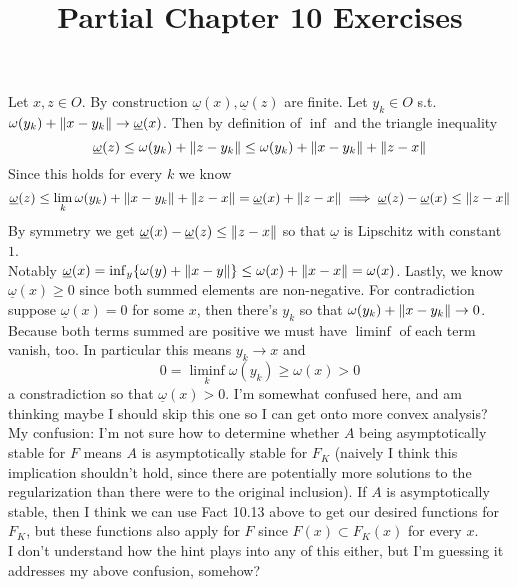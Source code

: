 \documentclass{article}
\title{Partial Chapter 10 Exercises}
\newenvironment{ex}[1]
  {\renewcommand\theexercise{#1}\exercise}
  {\endexercise}
\begin{document}
\begin{ex}{10.8} %
  \newcommand{\uw}{\underline{\omega}}
  \newcommand{\w}{\omega}

  Let $x, z \in O$. By construction $\uw(x), \uw(z)$ are finite. Let $y_k \in O$ s.t. $\w(y_k) + \norm{x - y_k} \to \uw(x)$. Then by definition of $\inf$ and the triangle inequality
  $$
  \uw(z) \le \w(y_k) + \norm{z - y_k} \le \w(y_k) + \norm{x - y_k} + \norm{z - x}
  $$
  Since this holds for every $k$ we know
  $$
  \uw(z) \le \lim_k \w(y_k) + \norm{x - y_k} + \norm{z - x} = \uw(x) + \norm{z - x} \implies \uw(z) - \uw(x) \le \norm{z - x}
  $$
  By symmetry we get $\uw(x) - \uw(z) \le \norm{z - x}$ so that $\uw$ is Lipschitz with constant $1$. \, \\

  Notably $\uw(x) = \inf_y \braces{ \w(y) + \norm{x - y} } \le \w(x) + \norm{x - x} = \w(x)$. Lastly, we know $\uw(x) \ge 0$ since both summed elements are non-negative. For contradiction suppose $\uw(x) = 0$ for some $x$, then there's $y_k$ so that $\w(y_k) + \norm{x - y_k} \to 0$. Because both terms summed are positive we must have $\liminf$ of each term vanish, too. In particular this means $y_k \to x$ and
  $$
  0 = \liminf_k \w(y_k) \ge \w(x) > 0
  $$
  a constradiction so that $\uw(x) > 0$.
\end{ex} %
\begin{ex}{10.14} %
  I'm somewhat confused here, and am thinking maybe I should skip this one so I can get onto more convex analysis? \, \\

  My confusion: I'm not sure how to determine whether $A$ being asymptotically stable for $F$ means $A$ is asymptotically stable for $F_K$ (naively I think this implication shouldn't hold, since there are potentially more solutions to the regularization than there were to the original inclusion). If $A$ is asymptotically stable, then I think we can use Fact 10.13 above to get our desired functions for $F_K$, but these functions also apply for $F$ since $F(x) \subset F_K(x)$ for every $x$. \, \\

  I don't understand how the hint plays into any of this either, but I'm guessing it addresses my above confusion, somehow?
\end{ex} %
\end{document}
